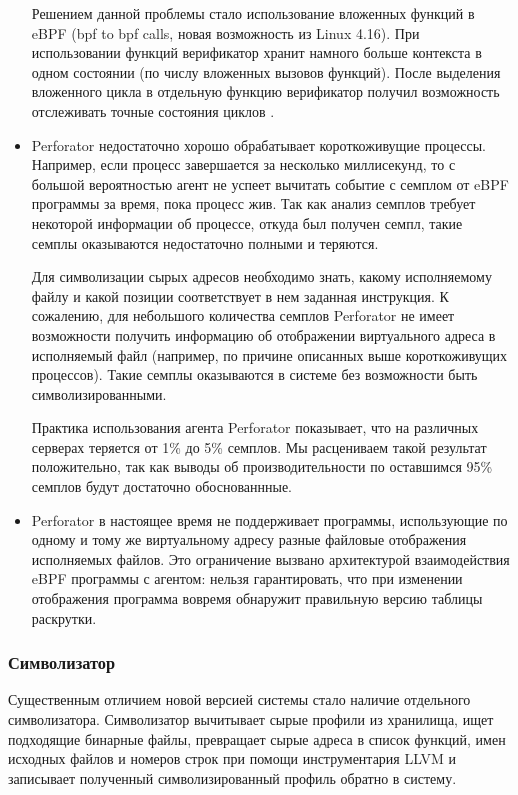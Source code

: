 \begin{itemize}
    Решением данной проблемы стало использование вложенных функций в eBPF (bpf to bpf calls, новая возможность из Linux 4.16).
    При использовании функций верификатор хранит намного больше контекста в одном состоянии (по числу вложенных вызовов функций).
    После выделения вложенного цикла в отдельную функцию верификатор получил возможность отслеживать точные состояния циклов \cite{bpf:func}.

    \item
    Perforator недостаточно хорошо обрабатывает короткоживущие процессы.
    Например, если процесс завершается за несколько миллисекунд, то с большой вероятностью агент не успеет вычитать событие с семплом
    от eBPF программы за время, пока процесс жив.
    Так как анализ семплов требует некоторой информации об процессе, откуда был получен семпл, такие семплы оказываются недостаточно полными
    и теряются.

    Для символизации сырых адресов необходимо знать, какому исполняемому файлу и какой позиции соответствует в нем
    заданная инструкция. К сожалению, для небольшого количества семплов Perforator не имеет возможности получить информацию об
    отображении виртуального адреса в исполняемый файл (например, по причине описанных выше короткоживущих процессов).
    Такие семплы оказываются в системе без возможности быть символизированными.

    Практика использования агента Perforator показывает, что на различных серверах теряется от 1\% до 5\% семплов.
    Мы расцениваем такой результат положительно, так как выводы об производительности по оставшимся 95\% семплов будут достаточно
    обоснованнные.

    \item
    Perforator в настоящее время не поддерживает программы, использующие по одному и тому же виртуальному адресу
    разные файловые отображения исполняемых файлов.
    Это ограничение вызвано архитектурой взаимодействия eBPF программы с агентом: нельзя гарантировать, что при изменении отображения
    программа вовремя обнаружит правильную версию таблицы раскрутки.
\end{itemize}

\subsubsection{Символизатор}
Существенным отличием новой версией системы стало наличие отдельного символизатора.
Символизатор вычитывает сырые профили из хранилища, ищет подходящие бинарные файлы,
превращает сырые адреса в список функций, имен исходных файлов и номеров строк при помощи инструментария LLVM
и записывает полученный символизированный профиль обратно в систему.

